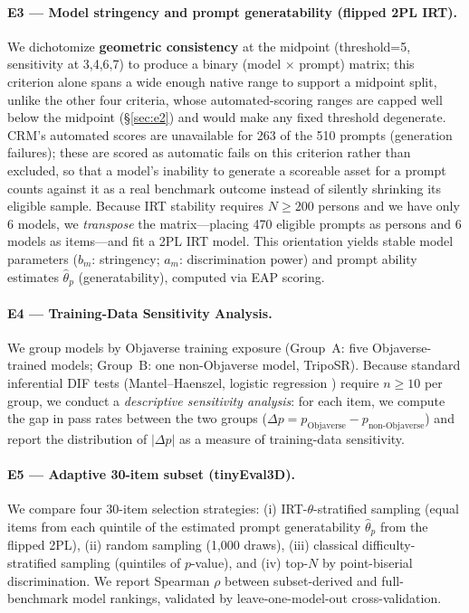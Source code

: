 \documentclass[10pt]{article}
\begin{document}
\paragraph{E3 — Model stringency and prompt generatability (flipped 2PL IRT).}
We dichotomize \textbf{geometric consistency} at the midpoint (threshold=5,
sensitivity at 3,4,6,7) to produce a binary (model $\times$ prompt) matrix;
this criterion alone spans a wide enough native range to support a
midpoint split, unlike the other four criteria, whose automated-scoring
ranges are capped well below the midpoint (\S\ref{sec:e2}) and would make
any fixed threshold degenerate. CRM's automated scores are unavailable for
263 of the 510 prompts (generation failures); these are scored as automatic
fails on this criterion rather than excluded, so that a model's inability
to generate a scoreable asset for a prompt counts against it as a real
benchmark outcome instead of silently shrinking its eligible sample.
Because IRT stability requires $N\geq200$ persons and we have only 6 models,
we \emph{transpose} the matrix—placing 470 eligible prompts as persons and
6 models as items—and fit a 2PL IRT model.
This orientation yields stable model parameters ($b_m$: stringency;
$a_m$: discrimination power) and prompt ability estimates
$\hat{\theta}_p$ (generatability), computed via EAP scoring.

\paragraph{E4 — Training-Data Sensitivity Analysis.}
We group models by Objaverse training exposure
(Group~A: five Objaverse-trained models; Group~B: one non-Objaverse model, TripoSR).
Because standard inferential DIF tests (Mantel–Haenszel, logistic regression
\citealt{difR2010}) require $n \geq 10$ per group, we conduct a
\emph{descriptive sensitivity analysis}: for each item, we compute the gap in
pass rates between the two groups ($\Delta p = p_\text{Objaverse} - p_\text{non-Objaverse}$)
and report the distribution of $|\Delta p|$ as a measure of training-data sensitivity.

\paragraph{E5 — Adaptive 30-item subset (tinyEval3D).}
We compare four 30-item selection strategies: (i) IRT-$\theta$-stratified
sampling (equal items from each quintile of the estimated prompt generatability
$\hat{\theta}_p$ from the flipped 2PL), (ii) random sampling (1{,}000 draws),
(iii) classical difficulty-stratified sampling (quintiles of $p$-value),
and (iv) top-$N$ by point-biserial discrimination.
We report Spearman $\rho$ between subset-derived and full-benchmark model
rankings, validated by leave-one-model-out cross-validation.
\end{document}
